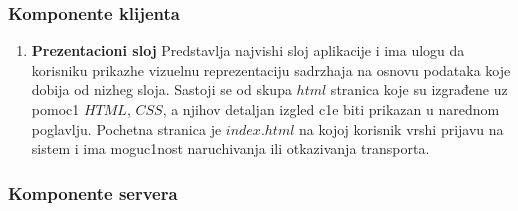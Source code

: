 \subsubsection{Komponente klijenta}
\begin{enumerate}
    \item \textbf{Prezentacioni sloj}
    Predstavlja najvishi sloj aplikacije i ima ulogu da korisniku
prikazhe vizuelnu reprezentaciju sadrzhaja na osnovu podataka koje dobija od nizheg
sloja. Sastoji se od skupa $html$ stranica koje su izgrađene uz pomoc1 $HTML$, $CSS$, a njihov detaljan izgled c1e biti prikazan u narednom poglavlju. Pochetna stranica je $index.html$ na kojoj korisnik vrshi prijavu na sistem i ima moguc1nost naruchivanja ili otkazivanja transporta. 
\end{enumerate}
\subsubsection{Komponente servera}
